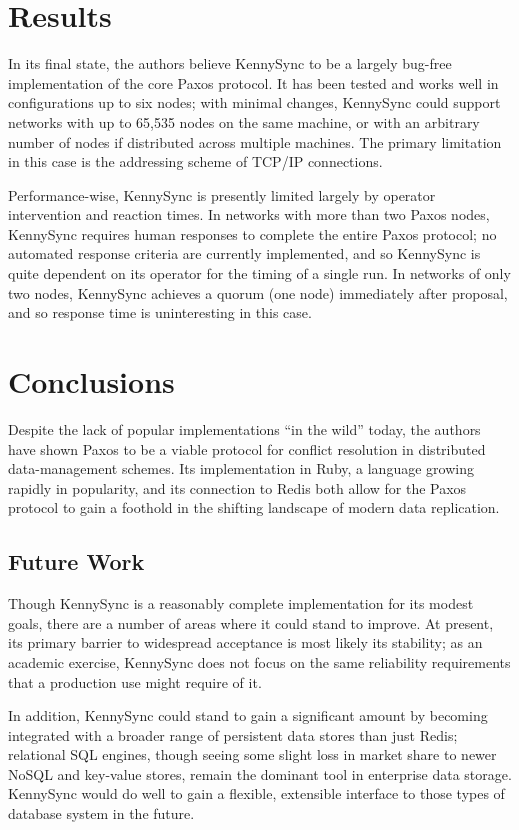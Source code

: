 \documentclass{acm_proc_article-sp}
\begin{document}
\section{Results}

In its final state, the authors believe KennySync to be a largely bug-free
implementation of the core Paxos protocol. It has been tested and works well in
configurations up to six nodes; with minimal changes, KennySync could support
networks with up to 65,535 nodes on the same machine, or with an arbitrary
number of nodes if distributed across multiple machines. The primary limitation
in this case is the addressing scheme of TCP/IP connections.

Performance-wise, KennySync is presently limited largely by operator
intervention and reaction times. In networks with more than two Paxos nodes,
KennySync requires human responses to complete the entire Paxos protocol; no
automated response criteria are currently implemented, and so KennySync is quite
dependent on its operator for the timing of a single run. In networks of only
two nodes, KennySync achieves a quorum (one node) immediately after proposal,
and so response time is uninteresting in this case.

\section{Conclusions}

Despite the lack of popular implementations ``in the wild'' today, the authors
have shown Paxos to be a viable protocol for conflict resolution in distributed
data-management schemes. Its implementation in Ruby, a language growing rapidly
in popularity, and its connection to Redis both allow for the Paxos protocol to
gain a foothold in the shifting landscape of modern data replication.

\subsection{Future Work}

Though KennySync is a reasonably complete implementation for its modest goals,
there are a number of areas where it could stand to improve. At present, its
primary barrier to widespread acceptance is most likely its stability; as an
academic exercise, KennySync does not focus on the same reliability requirements
that a production use might require of it.

In addition, KennySync could stand to gain a significant amount by becoming
integrated with a broader range of persistent data stores than just Redis;
relational SQL engines, though seeing some slight loss in market share to newer
NoSQL and key-value stores, remain the dominant tool in enterprise data storage.
KennySync would do well to gain a flexible, extensible interface to those types
of database system in the future.
\end{document}
